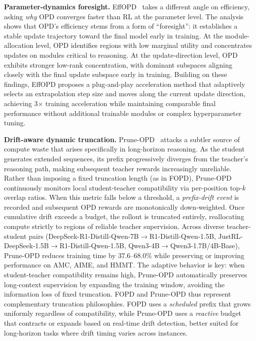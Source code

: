 \documentclass{article} %
\begin{document}
\textbf{Parameter-dynamics foresight.} EffOPD~\citep{2605.11739} takes a different angle on efficiency, asking \emph{why} OPD converges faster than RL at the parameter level. The analysis shows that OPD's efficiency stems from a form of ``foresight'': it establishes a stable update trajectory toward the final model early in training. At the module-allocation level, OPD identifies regions with low marginal utility and concentrates updates on modules critical to reasoning. At the update-direction level, OPD exhibits stronger low-rank concentration, with dominant subspaces aligning closely with the final update subspace early in training. Building on these findings, EffOPD proposes a plug-and-play acceleration method that adaptively selects an extrapolation step size and moves along the current update direction, achieving 3$\times$ training acceleration while maintaining comparable final performance without additional trainable modules or complex hyperparameter tuning.

\textbf{Drift-aware dynamic truncation.} Prune-OPD~\citep{2605.07804} attacks a subtler source of compute waste that arises specifically in long-horizon reasoning. As the student generates extended sequences, its prefix progressively diverges from the teacher's reasoning path, making subsequent teacher rewards increasingly unreliable. Rather than imposing a fixed truncation length (as in FOPD), Prune-OPD continuously monitors local student-teacher compatibility via per-position top-$k$ overlap ratios. When this metric falls below a threshold, a \emph{prefix-drift event} is recorded and subsequent OPD rewards are monotonically down-weighted. Once cumulative drift exceeds a budget, the rollout is truncated entirely, reallocating compute strictly to regions of reliable teacher supervision. Across diverse teacher-student pairs (DeepSeek-R1-Distill-Qwen-7B$\to$R1-Distill-Qwen-1.5B, JustRL-DeepSeek-1.5B$\to$R1-Distill-Qwen-1.5B, Qwen3-4B$\to$Qwen3-1.7B/4B-Base), Prune-OPD reduces training time by 37.6--68.0\% while preserving or improving performance on AMC, AIME, and HMMT. The adaptive behavior is key: when student-teacher compatibility remains high, Prune-OPD automatically preserves long-context supervision by expanding the training window, avoiding the information loss of fixed truncation. FOPD and Prune-OPD thus represent complementary truncation philosophies. FOPD uses a \emph{scheduled} prefix that grows uniformly regardless of compatibility, while Prune-OPD uses a \emph{reactive} budget that contracts or expands based on real-time drift detection, better suited for long-horizon tasks where drift timing varies across instances.
\end{document}
